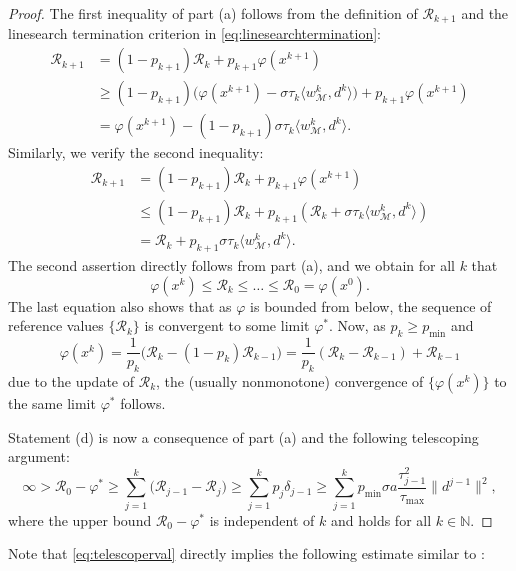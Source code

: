 \documentclass[a4paper, 12pt]{article}
\numberwithin{equation}{section}
\theoremstyle{bolddef}
\theoremstyle{definition}
\theoremstyle{boldplain}
\newcommand{\xk}{x^k}
\newcommand{\wk}{w^k}
\newcommand{\dk}{d^k}
\newcommand{\tauk}{\tau_k}
\newcommand{\xkp}{x^{k+1}}
\newcommand{\pmin}{p_{\min}}
\newcommand{\taumax}{\tau_\mathrm{max}}
\newcommand{\Rvalue}{\mathcal{R}}
\begin{document}
\begin{proof}
The first inequality of part (a) follows from the definition of $\Rvalue_{k+1}$ and the linesearch termination criterion in \eqref{eq:linesearchtermination}:
\begin{align*}
	\Rvalue_{k+1} &= (1-p_{k+1}) \Rvalue_k + p_{k+1} \varphi(\xkp) \\
	&\geq (1-p_{k+1}) \big(\varphi(\xkp) - \sigma \tauk \langle \wk_\mathcal{M} , \dk \rangle\big) + p_{k+1} \varphi(\xkp)\\
	&= \varphi(\xkp) - (1-p_{k+1})\sigma \tauk \langle \wk_\mathcal{M}, \dk \rangle.
\end{align*}
Similarly, we verify the second inequality:
\begin{align*}
	\Rvalue_{k+1} &= (1- p_{k+1}) \Rvalue_k + p_{k+1} \varphi(\xkp) \\
	&\leq (1-p_{k+1}) \Rvalue_k + p_{k+1} ( \Rvalue_k + \sigma \tau_k \langle \wk_\mathcal{M}, \dk \rangle)\\
	&= \Rvalue_k + p_{k+1} \sigma \tauk \langle \wk_\mathcal{M}, \dk \rangle.
\end{align*}
The second assertion directly follows from part (a), and we obtain for all $k$ that
\begin{equation*}
	\varphi(\xk) \leq \Rvalue_k \leq \dots \leq \Rvalue_0 = \varphi(x^0).
\end{equation*}
The last equation also shows that as $\varphi$ is bounded from below, the sequence of reference values $\{\Rvalue_k\}$ is convergent to some limit $\varphi^*$. Now, as $p_k \geq \pmin$ and
\begin{equation*}
	\varphi(\xk) = \frac{1}{p_k} \big( \Rvalue_k - (1-p_k) \Rvalue_{k-1}
	\big) = \frac{1}{p_k} (\Rvalue_k - \Rvalue_{k-1}) + \Rvalue_{k-1}
\end{equation*}
due to the update of $ \Rvalue_k $,
the (usually nonmonotone) convergence of $\{\varphi(\xk)\}$ to the same limit $\varphi^*$ follows.

Statement (d) is now a consequence of part (a)
and the following telescoping argument:
\begin{equation}\label{eq:telescoperval}
	\infty > \Rvalue_0 - \varphi^* \geq \sum_{j=1}^k 
	\big( \Rvalue_{j-1} - \Rvalue_j \big) \geq \sum_{j=1}^k p_j \delta_{j-1} \geq \sum_{j=1}^k \pmin \sigma a \frac{\tau_{j-1}^2}{\taumax} \|d^{j-1}\|^2,
\end{equation}
where the upper bound $\Rvalue_0 - \varphi^*$ is independent of $k$ and holds for all $k \in \mathbb{N}$.
\end{proof}
Note that \eqref{eq:telescoperval} directly implies the following estimate similar to \cite[Proposition 4.4]{aragon2025}:
\end{document}
